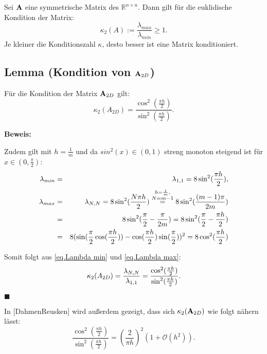 Sei ${\textbf{A}}$ eine symmetrische Matrix des $\mathbb{R}^{n \times n}$. Dann gilt für die euklidische Kondition der Matrix:
\begin{equation}
\kappa_{2} (A) := \frac {\lambda_{max}} {\lambda_{min}} \ge 1.\label{eq.Kondition}
\end{equation}
Je kleiner die Konditionszahl $\kappa$, desto besser ist eine Matrix konditioniert.

\subsection{Lemma (Kondition von ${\textbf{A}}_{2D}$)}\label{ss.Matrixkondition}

Für die Kondition der Matrix ${\textbf{A}}_{2D}$ gilt:
\begin{equation}
\kappa_{2} (A_{2D}) = \frac {\cos^{2}(\frac{\pi h}{2})} {\sin^{2}(\frac{\pi h}{2})}.
\end{equation}

\textbf{Beweis:}

Zudem gilt mit $h = \frac{1}{m}$ und da $sin^{2}(x) \in (0,1)$ streng monoton steigend ist für $x \in (0,\frac{\pi}{2})$:
\begin{eqnarray}
\lambda_{min} &=& \lambda_{1,1} = 8\sin^{2}(\frac{\pi h}{2}),\label{eq.Lambda min}\\
\lambda_{max} &=& \lambda_{N,N} = 8\sin^{2}(\frac{N\pi h}{2}) \overset{\substack{h=\frac {1} {m}, \\N=m-1}}{=} 8\sin^{2}(\frac{(m-1)\pi}{2m}) \notag \\
&=& 8\sin^{2}(\frac{\pi}{2} - \frac{\pi}{2m}) = 8\sin^{2}(\frac{\pi}{2} - \frac{\pi h}{2}) \notag \\
&=& 8(\sin(\frac{\pi}{2}\cos(\frac{\pi h}{2})) - \cos(\frac{\pi h}{2})\sin(\frac{\pi}{2}))^{2} = 8\cos^{2}(\frac{\pi h}{2}) \label{eq.Lambda max}
\end{eqnarray}

Somit folgt aus \autoref{eq.Lambda min} und \autoref{eq.Lambda max}:
\begin{equation}
\kappa_{2} (A_{2D}) = \frac {\lambda_{N,N}} {\lambda_{1,1}} = \frac {\cos^{2} (\frac {\pi h} {2})} {\sin^{2} (\frac {\pi h} {2})}. \notag
\end{equation}
\begin{flushright}
$\blacksquare$
\end{flushright}
In [DahmenReusken] wird außerdem gezeigt, dass sich $\kappa_{2}({\textbf{A}}_{2D})$ wie folgt nähern lässt:
\begin{equation}
\frac {\cos^{2} (\frac {\pi h} {2})} {\sin^{2} (\frac {\pi h} {2})} = \left( \frac {2} {\pi h} \right)^{2} (1 + \mathcal{O}(h^{2})).
\end{equation}

